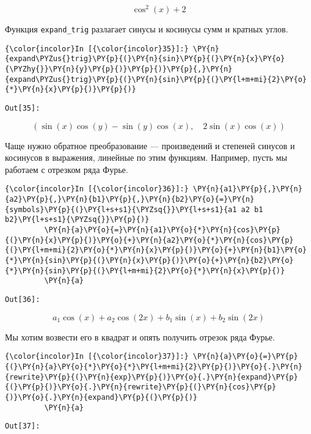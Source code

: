     \[\cos^{2}{\left (x \right )} + 2\]

    

    Функция \texttt{expand\_trig} разлагает синусы и косинусы сумм и кратных
углов.

    \begin{Verbatim}[commandchars=\\\{\}]
{\color{incolor}In [{\color{incolor}35}]:} \PY{n}{expand\PYZus{}trig}\PY{p}{(}\PY{n}{sin}\PY{p}{(}\PY{n}{x}\PY{o}{\PYZhy{}}\PY{n}{y}\PY{p}{)}\PY{p}{)}\PY{p}{,}\PY{n}{expand\PYZus{}trig}\PY{p}{(}\PY{n}{sin}\PY{p}{(}\PY{l+m+mi}{2}\PY{o}{*}\PY{n}{x}\PY{p}{)}\PY{p}{)}
\end{Verbatim}
\texttt{\color{outcolor}Out[{\color{outcolor}35}]:}
    
    \[\left ( \sin{\left (x \right )} \cos{\left (y \right )} - \sin{\left (y \right )} \cos{\left (x \right )}, \quad 2 \sin{\left (x \right )} \cos{\left (x \right )}\right )\]

    

    Чаще нужно обратное преобразование --- произведений и степеней синусов и
косинусов в выражения, линейные по этим функциям. Например, пусть мы
работаем с отрезком ряда Фурье.

    \begin{Verbatim}[commandchars=\\\{\}]
{\color{incolor}In [{\color{incolor}36}]:} \PY{n}{a1}\PY{p}{,}\PY{n}{a2}\PY{p}{,}\PY{n}{b1}\PY{p}{,}\PY{n}{b2}\PY{o}{=}\PY{n}{symbols}\PY{p}{(}\PY{l+s+s1}{\PYZsq{}}\PY{l+s+s1}{a1 a2 b1 b2}\PY{l+s+s1}{\PYZsq{}}\PY{p}{)}
         \PY{n}{a}\PY{o}{=}\PY{n}{a1}\PY{o}{*}\PY{n}{cos}\PY{p}{(}\PY{n}{x}\PY{p}{)}\PY{o}{+}\PY{n}{a2}\PY{o}{*}\PY{n}{cos}\PY{p}{(}\PY{l+m+mi}{2}\PY{o}{*}\PY{n}{x}\PY{p}{)}\PY{o}{+}\PY{n}{b1}\PY{o}{*}\PY{n}{sin}\PY{p}{(}\PY{n}{x}\PY{p}{)}\PY{o}{+}\PY{n}{b2}\PY{o}{*}\PY{n}{sin}\PY{p}{(}\PY{l+m+mi}{2}\PY{o}{*}\PY{n}{x}\PY{p}{)}
         \PY{n}{a}
\end{Verbatim}
\texttt{\color{outcolor}Out[{\color{outcolor}36}]:}
    
    \[a_{1} \cos{\left (x \right )} + a_{2} \cos{\left (2 x \right )} + b_{1} \sin{\left (x \right )} + b_{2} \sin{\left (2 x \right )}\]

    

    Мы хотим возвести его в квадрат и опять получить отрезок ряда Фурье.

    \begin{Verbatim}[commandchars=\\\{\}]
{\color{incolor}In [{\color{incolor}37}]:} \PY{n}{a}\PY{o}{=}\PY{p}{(}\PY{n}{a}\PY{o}{*}\PY{o}{*}\PY{l+m+mi}{2}\PY{p}{)}\PY{o}{.}\PY{n}{rewrite}\PY{p}{(}\PY{n}{exp}\PY{p}{)}\PY{o}{.}\PY{n}{expand}\PY{p}{(}\PY{p}{)}\PY{o}{.}\PY{n}{rewrite}\PY{p}{(}\PY{n}{cos}\PY{p}{)}\PY{o}{.}\PY{n}{expand}\PY{p}{(}\PY{p}{)}
         \PY{n}{a}
\end{Verbatim}
\texttt{\color{outcolor}Out[{\color{outcolor}37}]:}
    
